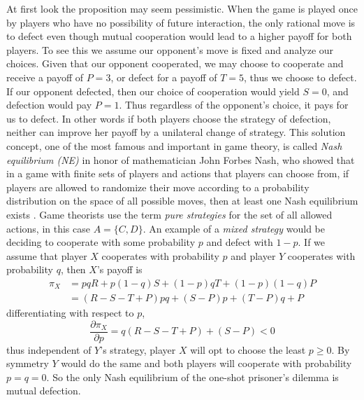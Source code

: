 At first look the proposition may seem pessimistic. When the game is played once by players who have no possibility of future interaction, the only rational move is to defect even though mutual cooperation would lead to a higher payoff for both players. To see this we assume our opponent's move is fixed and analyze our choices. Given that our opponent cooperated, we may choose to cooperate and receive a payoff of $P = 3$, or defect for a payoff of $T = 5$, thus we choose to defect. If our opponent defected, then our choice of cooperation would yield $S = 0$, and defection would pay $P = 1$. Thus regardless of the opponent's choice, it pays for us to defect. In other words if both players choose the strategy of defection, neither can improve her payoff by a unilateral change of strategy. This solution concept, one of the most famous and important in game theory, is called \textit{Nash equilibrium (NE)} in honor of mathematician John Forbes Nash, who showed that in a game with finite sets of players and actions that players can choose from, if players are allowed to randomize their move according to a probability distribution on the space of all possible moves, then at least one Nash equilibrium exists \cite{Nash1951}. Game theorists use the term \textit{pure strategies} for the set of all allowed actions, in this case $A = \{C, D\}$. An example of a \textit{mixed strategy} would be deciding to cooperate with some probability $p$ and defect with $1-p$. If we assume that player $X$ cooperates with probability $p$ and player $Y$ cooperates with probability $q$, then $X$'s payoff is
\begin{align*}
\pi_X &= pqR + p(1-q)S + (1-p)qT + (1-p)(1-q)P \\
&= (R - S - T + P)pq + (S - P)p + (T-P)q + P
\end{align*}
differentiating with respect to $p$,
\[
\frac{\partial \pi_X}{\partial p} = q(R - S - T + P) + (S-P) < 0
\]
thus independent of $Y$'s strategy, player $X$ will opt to choose the least $p \geq 0$. By symmetry $Y$ would do the same and both players will cooperate with probability $p = q = 0$. So the only Nash equilibrium of the one-shot prisoner's dilemma is mutual defection.

